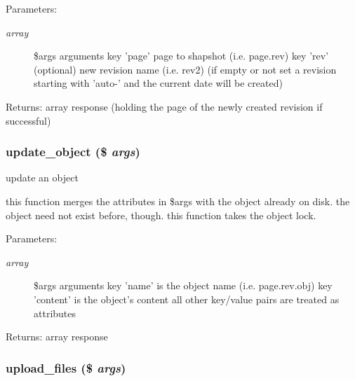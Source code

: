 \begin{Desc}
\item[Parameters:]
\begin{description}
\item[{\em array}]\$args arguments key 'page' page to shapshot (i.e. page.rev) key 'rev' (optional) new revision name (i.e. rev2) (if empty or not set a revision starting with 'auto-' and the current date will be created) \end{description}
\end{Desc}
\begin{Desc}
\item[Returns:]array response (holding the page of the newly created revision if successful) \end{Desc}
\hypertarget{module__glue_8inc_8php_4aed316adcde13b40c9fc1b35e6537a4}{
\subsubsection[{update\_\-object}]{\setlength{\rightskip}{0pt plus 5cm}update\_\-object (\$ {\em args})}}
\label{module__glue_8inc_8php_4aed316adcde13b40c9fc1b35e6537a4}


update an object

this function merges the attributes in \$args with the object already on disk. the object need not exist before, though. this function takes the object lock. \begin{Desc}
\item[Parameters:]
\begin{description}
\item[{\em array}]\$args arguments key 'name' is the object name (i.e. page.rev.obj) key 'content' is the object's content all other key/value pairs are treated as attributes \end{description}
\end{Desc}
\begin{Desc}
\item[Returns:]array response \end{Desc}
\hypertarget{module__glue_8inc_8php_43746135e67f614d79317029aced064b}{
\subsubsection[{upload\_\-files}]{\setlength{\rightskip}{0pt plus 5cm}upload\_\-files (\$ {\em args})}}
\label{module__glue_8inc_8php_43746135e67f614d79317029aced064b}



